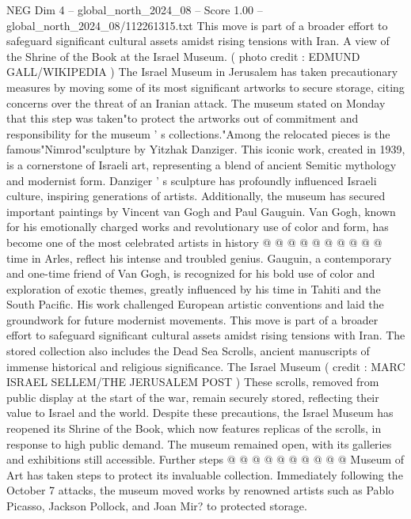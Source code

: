 \begin{textsample}{NEG Dim 4 – global\_north\_2024\_08 – Score 1.00 – global\_north\_2024\_08/112261315.txt}  \label{ex:f4_neg_310}
This move is part of a broader effort to safeguard significant cultural assets amidst rising tensions with Iran.
A view of the Shrine of the Book at the Israel Museum. ( photo credit : EDMUND GALL/WIKIPEDIA ) The Israel Museum in Jerusalem has taken precautionary measures by moving some of its most significant artworks to secure storage, citing concerns over the threat of an Iranian attack.
The museum stated on Monday that this step was taken"to protect the artworks out of commitment and responsibility for the museum ' s collections."Among the relocated pieces is the famous"Nimrod"sculpture by Yitzhak Danziger.
This iconic work, created in 1939, is a cornerstone of Israeli art, representing a blend of ancient Semitic mythology and modernist form.
Danziger ' s sculpture has profoundly influenced Israeli culture, inspiring generations of artists.
Additionally, the museum has secured important paintings by Vincent van Gogh and Paul Gauguin.
Van Gogh, known for his emotionally charged works and revolutionary use of color and form, has become one of the most celebrated artists in history @ @ @ @ @ @ @ @ @ @ time in Arles, reflect his intense and troubled genius.
Gauguin, a contemporary and one-time friend of Van Gogh, is recognized for his bold use of color and exploration of exotic themes, greatly influenced by his time in Tahiti and the South Pacific.
His work challenged European artistic conventions and laid the groundwork for future modernist movements.
This move is part of a broader effort to safeguard significant cultural assets amidst rising tensions with Iran.
The stored collection also includes the Dead Sea Scrolls, ancient manuscripts of immense historical and religious significance.
The Israel Museum ( credit : MARC ISRAEL SELLEM/THE JERUSALEM POST ) These scrolls, removed from public display at the start of the war, remain securely stored, reflecting their value to Israel and the world.
Despite these precautions, the Israel Museum has reopened its Shrine of the Book, which now features replicas of the scrolls, in response to high public demand.
The museum remained open, with its galleries and exhibitions still accessible.
Further steps @ @ @ @ @ @ @ @ @ @ Museum of Art has taken steps to protect its invaluable collection.
Immediately following the October 7 attacks, the museum moved works by renowned artists such as Pablo Picasso, Jackson Pollock, and Joan Mir? to protected storage.

\end{textsample}
